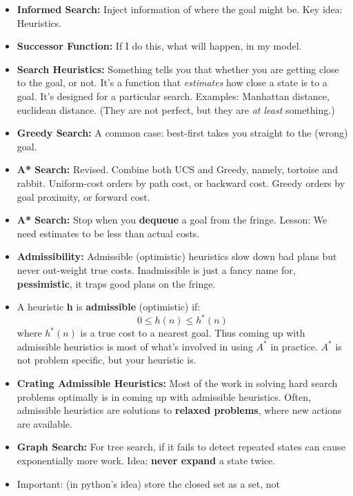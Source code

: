 \documentclass[twocolumn]{article}
\begin{document}
\begin{itemize}
\item \textbf{Informed Search:} Inject information of where the goal
  might be. Key idea: Heuristics.
\item \textbf{Successor Function:} If I do this, what will
  happen, in my model.
\item \textbf{Search Heuristics:} Something tells you that whether you
  are getting close to the goal, or not. It's a function that
  \emph{estimates} how close a state is to a goal. It's designed for a
  particular search. Examples: Manhattan distance, euclidean
  distance. (They are not perfect, but they are \emph{at least}
  something.) 
\item \textbf{Greedy Search:} A common case: best-first takes you
  straight to the (wrong) goal.
\item \textbf{A* Search:} Revised. Combine both UCS and Greedy,
  namely, tortoise and rabbit. Uniform-cost orders by path cost, or
  backward cost. Greedy orders by goal proximity, or forward cost.
\item \textbf{A* Search:} Stop when you \textbf{dequeue} a goal from
  the fringe. Lesson: We need estimates to be less than actual costs.
\item \textbf{Admissibility:} Admissible (optimistic) heuristics slow
  down bad plans but never out-weight true costs. Inadmissible is just
  a fancy name for, \textbf{pessimistic}, it traps good plans on the
  fringe. 
\item A heuristic \textbf{h} is \textbf{admissible} (optimistic) if: 
  \begin{equation}
    \label{eq:1}
    0\leq h(n)\leq h^{*}(n)
  \end{equation}
  where $h^{*}(n)$ is a true cost to a nearest goal. Thus coming up
  with admissible heuristics is most of what's involved in using
  $A^{*}$ in practice. $A^{*}$ is not problem specific, but your
  heuristic is.
\item \textbf{Crating Admissible Heuristics:} Most of the work in
  solving hard search problems optimally is in coming up with
  admissible heuristics. Often, admissible heuristics are solutions to
  \textbf{relaxed problems}, where new actions are available.
\item \textbf{Graph Search:} For tree search, if it fails to detect
  repeated states can cause exponentially more work. Idea:
  \textbf{never expand} a state twice.
\item Important: (in python's idea) store the closed set as a set, not

\end{itemize}
\end{document}
